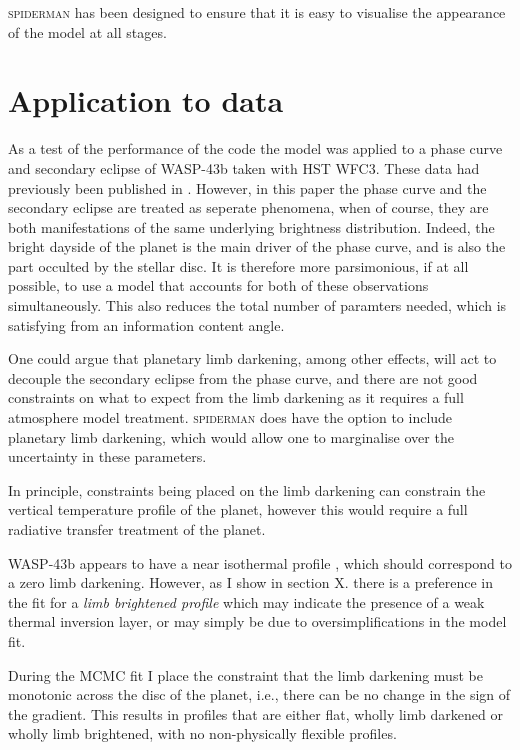 \documentclass[a4paper,fleqn,usenatbib]{mnras}
\begin{document}
\textsc{spiderman} has been designed to ensure that it is easy to visualise the appearance of the model at all stages.

\section{Application to data}\label{sec:Observations}

As a test of the performance of the code the model was applied to a phase curve and secondary eclipse of WASP-43b taken with HST WFC3. These data had previously been published in \citet{Stevenson2014}. However, in this paper the phase curve and the secondary eclipse are treated as seperate phenomena, when of course, they are both manifestations of the same underlying brightness distribution. Indeed, the bright dayside of the planet is the main driver of the phase curve, and is also the part occulted by the stellar disc. It is therefore more parsimonious, if at all possible, to use a model that accounts for both of these observations simultaneously. This also reduces the total number of paramters needed, which is satisfying from an information content angle.

One could argue that planetary limb darkening, among other effects, will act to decouple the secondary eclipse from the phase curve, and there are not good constraints on what to expect from the limb darkening as it requires a full atmosphere model treatment. \textsc{spiderman} does have the option to include planetary limb darkening, which would allow one to marginalise over the uncertainty in these parameters. 

In principle, constraints being placed on the limb darkening can constrain the vertical temperature profile of the planet, however this would require a full radiative transfer treatment of the planet.

WASP-43b appears to have a near isothermal profile \citep{Stevenson2014}, which should correspond to a zero limb darkening. However, as I show in section X. there is a preference in the fit for a \emph{limb brightened profile} which may indicate the presence of a weak thermal inversion layer, or may simply be due to oversimplifications in the model fit.

During the MCMC fit I place the constraint that the limb darkening must be monotonic across the disc of the planet, i.e., there can be no change in the sign of the gradient. This results in profiles that are either flat, wholly limb darkened or wholly limb brightened, with no non-physically flexible profiles.
\end{document}
